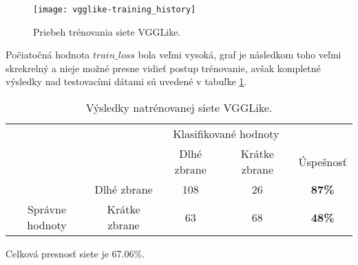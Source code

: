 \begin{figure}[H]
	\centering
	\texttt{[image: vgglike-training\_history]}
	\caption{Priebeh trénovania siete VGGLike.}
	\label{pic:vgglikehistory}
\end{figure}

Počiatočná hodnota $train\_loss$ bola veľmi vysoká, graf je následkom toho veľmi skrekrelný a nieje možné presne vidieť postup trénovanie,
    avšak kompletné výsledky nad testovacími dátami sú uvedené v tabuľke \ref{tab:vgglikeresults}.

\begin{table}[H]
    \centering
    \begin{tabular}{ccccc}
                                                                &                                    & \multicolumn{2}{c}{Klasifikované hodnoty}                                                         &                                    \\ \cline{3-5} 
                                                                & \multicolumn{1}{c|}{}              & \multicolumn{1}{c|}{Dlhé zbrane}                & \multicolumn{1}{c|}{Krátke zbrane}              & \multicolumn{1}{c|}{Úspešnosť}     \\ \cline{2-5} 
        \multicolumn{1}{c|}{}                                  & \multicolumn{1}{c|}{Dlhé zbrane}   & \multicolumn{1}{c|}{{\color[HTML]{009901} 108}} & \multicolumn{1}{c|}{{\color[HTML]{9A0000} 26}}  & \multicolumn{1}{c|}{\textbf{87\%}} \\ \cline{2-5} 
        \multicolumn{1}{c|}{\multirow{-2}{*}{Správne hodnoty}} & \multicolumn{1}{c|}{Krátke zbrane} & \multicolumn{1}{c|}{{\color[HTML]{9A0000} 63}}  & \multicolumn{1}{c|}{{\color[HTML]{009901} 68}} & \multicolumn{1}{c|}{\textbf{48\%}} \\ \cline{2-5} 
    \end{tabular}
    \caption{Výsledky natrénovanej siete VGGLike.}
    \label{tab:vgglikeresults}
\end{table}
Celková presnosť siete je 67.06\%.
